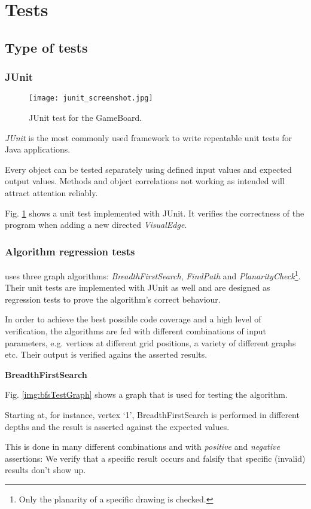 \section{Tests}
\label{section:tests}

\subsection{Type of tests}

\subsubsection{JUnit}

\begin{figure}[h]
	\centering
	\texttt{[image: junit\_screenshot.jpg]}
	\caption{JUnit test for the GameBoard.}
	\label{img:screenJUnit}
\end{figure}
\emph{JUnit} is the most commonly used framework to write repeatable unit tests for Java applications.\par
Every object can be tested separately using defined input values and expected output values. Methods and object correlations not working as intended will attract attention reliably.\par
Fig. \ref{img:screenJUnit} shows a unit test implemented with JUnit. It verifies the correctness of the program when adding a new directed \emph{VisualEdge}.

\subsubsection{Algorithm regression tests}

\graphioli uses three graph algorithms: \emph{BreadthFirstSearch}, \emph{FindPath} and \emph{PlanarityCheck}\footnote{Only the planarity of a specific drawing is checked.}. Their unit tests are implemented with JUnit as well and are designed as regression tests to prove the algorithm's correct behaviour.\par
In order to achieve the best possible code coverage and a high level of verification, the algorithms are fed with different combinations of input parameters, e.g. vertices at different grid positions, a variety of different graphs etc. Their output is verified agains the asserted results.\par

\textbf{BreadthFirstSearch}\par
Fig. \ref{img:bfsTestGraph} shows a graph that is used for testing the algorithm.\par
Starting at, for instance, vertex `1', BreadthFirstSearch is performed in different depths and the result is asserted against the expected values.\par
This is done in many different combinations and with \emph{positive} and \emph{negative} assertions: We verify that a specific result occurs and falsify that specific (invalid) results don't show up.\par


